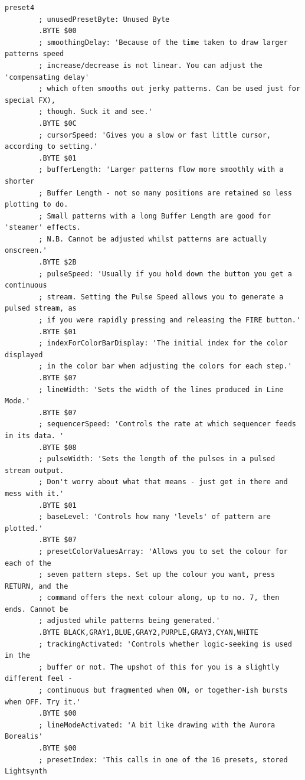 \begin{lstlisting}[basicstyle=\ttfamily\tiny,caption=Source code for Preset 4.]
preset4
        ; unusedPresetByte: Unused Byte
        .BYTE $00
        ; smoothingDelay: 'Because of the time taken to draw larger patterns speed
        ; increase/decrease is not linear. You can adjust the 'compensating delay'
        ; which often smooths out jerky patterns. Can be used just for special FX),
        ; though. Suck it and see.'
        .BYTE $0C
        ; cursorSpeed: 'Gives you a slow or fast little cursor, according to setting.'
        .BYTE $01
        ; bufferLength: 'Larger patterns flow more smoothly with a shorter
        ; Buffer Length - not so many positions are retained so less plotting to do.
        ; Small patterns with a long Buffer Length are good for 'steamer' effects.
        ; N.B. Cannot be adjusted whilst patterns are actually onscreen.'
        .BYTE $2B
        ; pulseSpeed: 'Usually if you hold down the button you get a continuous
        ; stream. Setting the Pulse Speed allows you to generate a pulsed stream, as
        ; if you were rapidly pressing and releasing the FIRE button.'
        .BYTE $01
        ; indexForColorBarDisplay: 'The initial index for the color displayed
        ; in the color bar when adjusting the colors for each step.'
        .BYTE $07
        ; lineWidth: 'Sets the width of the lines produced in Line Mode.'
        .BYTE $07
        ; sequencerSpeed: 'Controls the rate at which sequencer feeds in its data. '
        .BYTE $08
        ; pulseWidth: 'Sets the length of the pulses in a pulsed stream output.
        ; Don't worry about what that means - just get in there and mess with it.'
        .BYTE $01
        ; baseLevel: 'Controls how many 'levels' of pattern are plotted.'
        .BYTE $07
        ; presetColorValuesArray: 'Allows you to set the colour for each of the
        ; seven pattern steps. Set up the colour you want, press RETURN, and the
        ; command offers the next colour along, up to no. 7, then ends. Cannot be
        ; adjusted while patterns being generated.'
        .BYTE BLACK,GRAY1,BLUE,GRAY2,PURPLE,GRAY3,CYAN,WHITE
        ; trackingActivated: 'Controls whether logic-seeking is used in the
        ; buffer or not. The upshot of this for you is a slightly different feel -
        ; continuous but fragmented when ON, or together-ish bursts when OFF. Try it.'
        .BYTE $00
        ; lineModeActivated: 'A bit like drawing with the Aurora Borealis'
        .BYTE $00
        ; presetIndex: 'This calls in one of the 16 presets, stored Lightsynth

\end{lstlisting}
